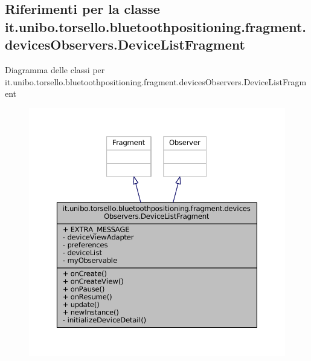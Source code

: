 \hypertarget{classit_1_1unibo_1_1torsello_1_1bluetoothpositioning_1_1fragment_1_1devicesObservers_1_1DeviceListFragment}{}\subsection{Riferimenti per la classe it.\+unibo.\+torsello.\+bluetoothpositioning.\+fragment.\+devices\+Observers.\+Device\+List\+Fragment}
\label{classit_1_1unibo_1_1torsello_1_1bluetoothpositioning_1_1fragment_1_1devicesObservers_1_1DeviceListFragment}


Diagramma delle classi per it.\+unibo.\+torsello.\+bluetoothpositioning.\+fragment.\+devices\+Observers.\+Device\+List\+Fragment
\nopagebreak
\begin{figure}[H]
\begin{center}
\leavevmode
\includegraphics[width=350pt]{classit_1_1unibo_1_1torsello_1_1bluetoothpositioning_1_1fragment_1_1devicesObservers_1_1DeviceListFragment__inherit__graph}
\end{center}
\end{figure}


